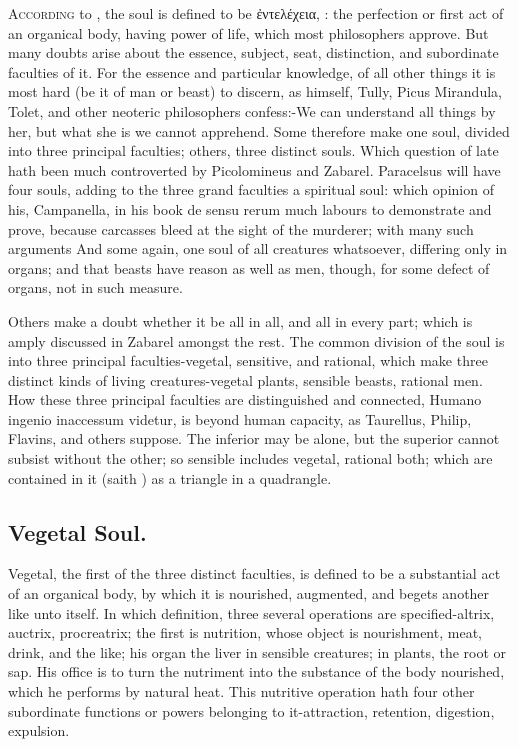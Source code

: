 {\lettrine{A}{ccording} to \Aristotle{}, the soul is defined to be \textgreek{ἐντελέχεια},
: the perfection or first act of an organical body, having
power of life, which most philosophers approve. But many doubts
arise about the essence, subject, seat, distinction, and subordinate
faculties of it. For the essence and particular knowledge, of all other
things it is most hard (be it of man or beast) to discern, as
\Aristotle himself, Tully, Picus Mirandula, Tolet,
and other neoteric philosophers confess:-We can understand all
things by her, but what she is we cannot apprehend. Some therefore make
one soul, divided into three principal faculties; others, three
distinct souls. Which question of late hath been much controverted by
Picolomineus and Zabarel.  Paracelsus will have four souls, adding
to the three grand faculties a spiritual soul: which opinion of his,
Campanella, in his book de sensu rerum much labours to demonstrate
and prove, because carcasses bleed at the sight of the murderer; with
many such arguments And some again, one soul of all creatures
whatsoever, differing only in organs; and that beasts have reason as
well as men, though, for some defect of organs, not in such measure.

Others make a doubt whether it be all in all, and all in every part;
which is amply discussed in Zabarel amongst the rest. The common
division of the soul is into three principal faculties-vegetal,
sensitive, and rational, which make three distinct kinds of living
creatures-vegetal plants, sensible beasts, rational men. How these
three principal faculties are distinguished and connected, Humano
ingenio inaccessum videtur, is beyond human capacity, as 
Taurellus, Philip, Flavins, and others suppose. The inferior may be
alone, but the superior cannot subsist without the other; so sensible
includes vegetal, rational both; which are contained in it (saith
\Aristotle)  as a triangle in a quadrangle.
\subsection{Vegetal Soul.}
Vegetal, the first of the three distinct faculties, is
defined to be a substantial act of an organical body, by which it is
nourished, augmented, and begets another like unto itself. In which
definition, three several operations are specified-altrix, auctrix,
procreatrix; the first is nutrition, whose object is nourishment,
meat, drink, and the like; his organ the liver in sensible creatures;
in plants, the root or sap. His office is to turn the nutriment into
the substance of the body nourished, which he performs by natural heat.
This nutritive operation hath four other subordinate functions or
powers belonging to it-attraction, retention, digestion, expulsion.
}
